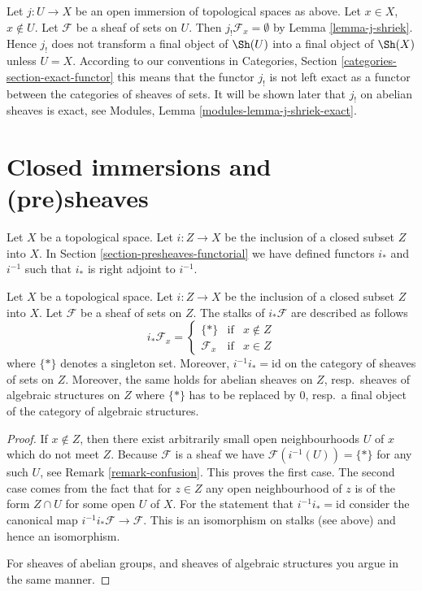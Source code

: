 \begin{remark}
\label{remark-j-shriek-not-exact}
Let $j : U \to X$ be an open immersion of topological spaces as above.
Let $x \in X$, $x \not \in U$. Let $\mathcal{F}$ be a sheaf of sets
on $U$. Then $j_!\mathcal{F}_x = \emptyset$ by Lemma \ref{lemma-j-shriek}.
Hence $j_!$ does not transform a final object of $\Sh(U)$
into a final object of $\Sh(X)$ unless $U = X$.
According to our conventions in
Categories, Section \ref{categories-section-exact-functor}
this means that the functor $j_!$ is not left exact
as a functor between the categories of sheaves of sets.
It will be shown later that $j_!$ on abelian sheaves is exact,
see Modules, Lemma \ref{modules-lemma-j-shriek-exact}.
\end{remark}








\section{Closed immersions and (pre)sheaves}
\label{section-closed-immersions}

\noindent
Let $X$ be a topological space.
Let $i : Z \to X$ be the inclusion of a closed subset $Z$ into $X$.
In Section \ref{section-presheaves-functorial} we have defined
functors $i_*$ and $i^{-1}$ such that $i_*$ is right adjoint to
$i^{-1}$.

\begin{lemma}
\label{lemma-stalks-closed-pushforward}
Let $X$ be a topological space.
Let $i : Z \to X$ be the inclusion of a closed subset $Z$ into $X$.
Let $\mathcal{F}$ be a sheaf of sets on $Z$.
The stalks of $i_*\mathcal{F}$ are described as follows
$$
i_*\mathcal{F}_x =
\left\{
\begin{matrix}
\{*\} & \text{if} & x \not \in Z \\
\mathcal{F}_x & \text{if} & x \in Z
\end{matrix}
\right.
$$
where $\{*\}$ denotes a singleton set. Moreover,
$i^{-1}i_* = \text{id}$ on the category of sheaves
of sets on $Z$. Moreover, the same holds for abelian
sheaves on $Z$, resp.\ sheaves of algebraic structures on $Z$
where $\{*\}$ has to be replaced by $0$, resp.\ a
final object of the category of algebraic structures.
\end{lemma}

\begin{proof}
If $x \not \in Z$, then there exist arbitrarily small open
neighbourhoods $U$ of $x$ which do not meet $Z$.
Because $\mathcal{F}$ is a sheaf
we have $\mathcal{F}(i^{-1}(U)) = \{*\}$ for any such $U$,
see Remark \ref{remark-confusion}. This proves the first case.
The second case comes from the fact that for $z \in Z$
any open neighbourhood of $z$ is of the form $Z \cap U$ for
some open $U$ of $X$. For the statement that
$i^{-1}i_* = \text{id}$ consider the canonical map
$i^{-1}i_*\mathcal{F} \to \mathcal{F}$. This is an isomorphism
on stalks (see above) and hence an isomorphism.

\medskip\noindent
For sheaves of abelian groups, and sheaves of algebraic structures
you argue in the same manner.
\end{proof}


